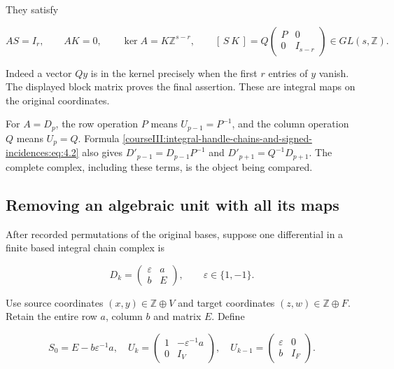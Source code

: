 They satisfy

\begin{equation}
AS=I_r,\qquad AK=0,\qquad
 \ker A=K\mathbb Z^{s-r},\qquad
 [\,S\ K\,]
 =Q\begin{pmatrix}P&0\\0&I_{s-r}\end{pmatrix}\in GL(s,\mathbb Z).
 \label{courseIII:integral-handle-chains-and-signed-incidences:eq:4.7}
\end{equation}

Indeed a vector \(Qy\) is in the kernel precisely when the first \(r\) entries of \(y\) vanish. The displayed block matrix proves the final assertion. These are integral maps on the original coordinates.

For \(A=D_p\), the row operation \(P\) means \(U_{p-1}=P^{-1}\), and the column operation \(Q\) means \(U_p=Q\). Formula \eqref{courseIII:integral-handle-chains-and-signed-incidences:eq:4.2} also gives \(D'_{p-1}=D_{p-1}P^{-1}\) and \(D'_{p+1}=Q^{-1}D_{p+1}\). The complete complex, including these terms, is the object being compared.

\subsection{Removing an algebraic unit with all its maps}
\label{courseIII:integral-handle-chains-and-signed-incidences:handle-unit-contraction}

\label{courseIII:integral-handle-chains-and-signed-incidences:section-5}\label{courseIII:handle-chains:5}

After recorded permutations of the original bases, suppose one differential in a finite based integral chain complex is

\begin{equation}
D_k=\begin{pmatrix}\varepsilon&a\\b&E\end{pmatrix},
 \qquad\varepsilon\in\{1,-1\}.
 \label{courseIII:integral-handle-chains-and-signed-incidences:eq:5.1}
\end{equation}

Use source coordinates \((x,y)\in\mathbb Z\oplus V\) and target coordinates \((z,w)\in\mathbb Z\oplus F\). Retain the entire row \(a\), column \(b\) and matrix \(E\). Define

\begin{equation}
S_0=E-b\varepsilon^{-1}a,\quad
 U_k=\begin{pmatrix}1&-\varepsilon^{-1}a\\0&I_V\end{pmatrix},
 \quad U_{k-1}=\begin{pmatrix}\varepsilon&0\\b&I_F\end{pmatrix}.
 \label{courseIII:integral-handle-chains-and-signed-incidences:eq:5.2}
\end{equation}

